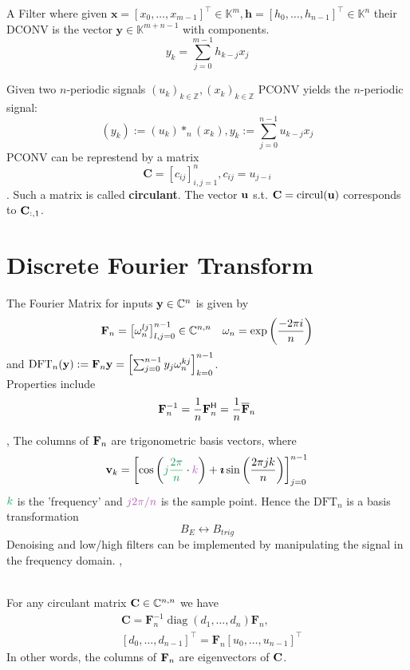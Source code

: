  A Filter where given $\mathbf{x}=\left[x_{0}, \ldots, x_{m-1}\right]^{\top} \in \mathbb{K}^{m}, \mathbf{h}=\left[h_{0}, \ldots, h_{n-1}\right]^{\top} \in \mathbb{K}^{n}$ their DCONV is the vector $\mathbf{y} \in \mathbb{K}^{m+n-1}$ with components.
$$y_{k}=\sum_{j=0}^{m-1} h_{k-j} x_{j}$$

 Given two $n$-periodic signals $\left(u_{k}\right)_{k \in \mathbb{Z}},\left(x_{k}\right)_{k \in \mathbb{Z}}$ PCONV yields the $n$-periodic signal:
$$\left(y_{k}\right):=\left(u_{k}\right) *_{n}\left(x_{k}\right), y_{k}:=\sum_{j=0}^{n-1} u_{k-j} x_{j}$$
PCONV can be represtend by a matrix $$\mathbf{C}=\left[c_{i j}\right]_{i, j=1}^{n}, c_{i j} = u_{j-i}$$. Such a matrix is called \textbf{circulant}. The vector $\mathbf{u}$ s.t. $\mathbf{C} = \operatorname{circul}(\mathbf{u})$ corresponds to $\mathbf{C}_{:,1}$.

\section{Discrete Fourier Transform}
The Fourier Matrix for inputs $\mathbf{y} \in \mathbb{C}^{n}$ is given by
$$ \mathbf{F}_n = \left[\omega_{n}^{l j}\right]_{l, j=0}^{n-1} \in \mathbb{C}^{n, n} \quad \omega_{n} = \exp\left(\frac{-2\pi i}{n}\right)$$
and $\mathrm{DFT}_{n}(\mathbf{y}):=\mathbf{F}_{n} \mathbf{y} = \left[\sum_{j=0}^{n-1} y_{j} \omega_{n}^{k j}\right]_{k=0}^{n-1}$. \\ Properties include
$$\mathbf{F}_{n}^{-1}=\frac{1}{n} \mathbf{F}_{n}^{\mathsf{H}}=\frac{1}{n} \overline{\mathbf{F}}_{n}$$

\sep
{}
The columns of $\mathbf{F}_n$ are trigonometric basis vectors, where 
$$\vv_k = \left[\cos \left(\tcg{j\frac{2 \pi}{n}}\cdot \tcp{k}\right)+\boldsymbol{\imath} \sin \left(\frac{2 \pi j k}{n}\right)\right]_{j=0}^{n-1}$$
$\tcg{k}$ is the 'frequency' and $\tcp{j2\pi/n}$ is  the sample point.
Hence the $\mathrm{DFT}_{n}$ is a basis transformation $$B_E \leftrightarrow B_{trig}$$
Denoising and low/high filters can be implemented by manipulating the signal in the frequency domain.
\sep

 \\
For any circulant matrix $\mathbf{C} \in \mathbb{C}^{n,n}$ we have 
\begin{align*}
&\mathbf{C}=\mathbf{F}_{n}^{-1} \operatorname{diag}\left(d_{1}, \ldots, d_{n}\right) \mathbf{F}_{n}, \\ 
&\left[d_{0}, \ldots, d_{n-1}\right]^{\top}=\mathbf{F}_{n}\left[u_{0}, \ldots, u_{n-1}\right]^{\top}
\end{align*}
In other words, the columns of $\mathbf{F}_n$ are eigenvectors of $\mathbf{C}$. \\

